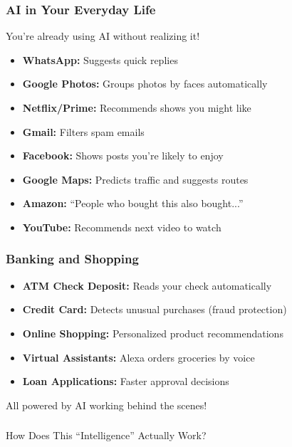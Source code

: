 \begin{frame}[fragile]\frametitle{AI in Your Everyday Life}

You're already using AI without realizing it!

\begin{itemize}
\item {\bf WhatsApp:} Suggests quick replies
\item {\bf Google Photos:} Groups photos by faces automatically
\item {\bf Netflix/Prime:} Recommends shows you might like
\item {\bf Gmail:} Filters spam emails
\item {\bf Facebook:} Shows posts you're likely to enjoy
\item {\bf Google Maps:} Predicts traffic and suggests routes
\item {\bf Amazon:} ``People who bought this also bought...''
\item {\bf YouTube:} Recommends next video to watch
\end{itemize}
\end{frame}

\begin{frame}[fragile]\frametitle{Banking and Shopping}
\begin{itemize}
\item {\bf ATM Check Deposit:} Reads your check automatically
\item {\bf Credit Card:} Detects unusual purchases (fraud protection)
\item {\bf Online Shopping:} Personalized product recommendations
\item {\bf Virtual Assistants:} Alexa orders groceries by voice
\item {\bf Loan Applications:} Faster approval decisions
\end{itemize}

\vspace{0.5cm}
All powered by AI working behind the scenes!
\end{frame}

\begin{frame}[fragile]\frametitle{}
\begin{center}
{\Large How Does This ``Intelligence'' Actually Work?}
\end{center}
\end{frame}

